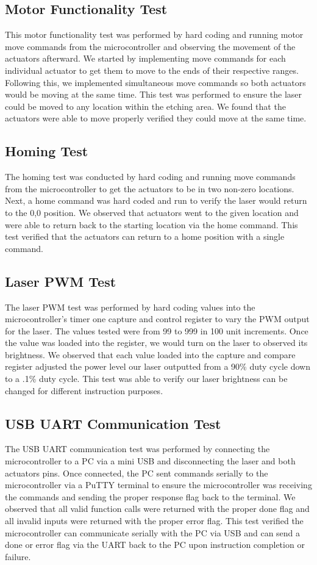 \documentclass[11pt]{LaTeX-Classes/math-hw}
\begin{document}
\subsection{Motor Functionality Test}
This motor functionality test was performed by hard coding and running motor move commands from the microcontroller and observing the movement of the actuators afterward. We started by implementing move commands for each individual actuator to get them to move to the ends of their respective ranges. Following this, we implemented simultaneous move commands so both actuators would be moving at the same time. This test was performed to ensure the laser could be moved to any location within the etching area. We found that the actuators were able to move properly verified they could move at the same time. 

\subsection{Homing Test}
The homing test was conducted by hard coding and running move commands from the microcontroller to get the actuators to be in two non-zero locations. Next, a home command was hard coded and run to verify the laser would return to the 0,0 position. We observed that actuators went to the given location and were able to return back to the starting location via the home command. This test verified that the actuators can return to a home position with a single command.  

\subsection{Laser PWM Test}
The laser PWM test was performed by hard coding values into the microcontroller's timer one capture and control register to vary the PWM output for the laser. The values tested were from 99 to 999 in 100 unit increments. Once the value was loaded into the register, we would turn on the laser to observed its brightness. We observed that each value loaded into the capture and compare register adjusted the power level our laser outputted from a 90\% duty cycle down to a .1\% duty cycle. This test was able to verify our laser brightness can be changed for different instruction purposes.
 
\subsection{USB UART Communication Test}
The USB UART communication test was performed by connecting the microcontroller to a PC via a mini USB and disconnecting the laser and both actuators pins. Once connected, the PC sent commands serially to the microcontroller via a PuTTY terminal to ensure the microcontroller was receiving the commands and sending the proper response flag back to the terminal. We observed that all valid function calls were returned with the proper done flag and all invalid inputs were returned with the proper error flag. This test verified the microcontroller can communicate serially with the PC via USB and can send a done or error flag via the UART back to the PC upon instruction completion or failure.
\end{document}
